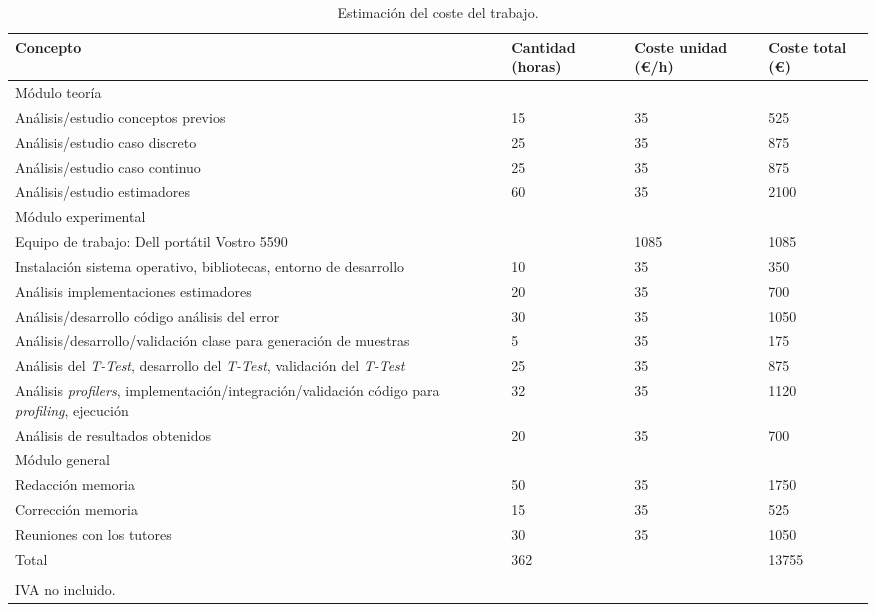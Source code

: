 \documentclass[12pt,a4paper]{report} %
\theoremstyle{definition}
\begin{document}
\begin{table}[hpt]
  
\begin{adjustwidth}{-.4in}{-.4in} 
\centering
\caption{Estimación del coste del trabajo.}
\label{tab:coste}
\begin{tabular}{p{7.3cm}R{2cm}R{2cm}R{2cm}}
  \toprule
Concepto & Cantidad (horas) & Coste unidad (€/h) & Coste total (€)\\
 \midrule
Módulo teoría & & &\\
 \midrule
 Análisis/estudio conceptos previos & 15 & 35 & 525\\[3pt]
 Análisis/estudio caso discreto & 25 & 35 & 875\\[3pt]
 Análisis/estudio caso continuo & 25 & 35 & 875\\[3pt]
 Análisis/estudio estimadores & 60 & 35 & 2100\\[5pt]
 \midrule
 Módulo experimental & & &\\
 \midrule
 Equipo de trabajo: Dell portátil Vostro 5590 & & 1085 & 1085\\[3pt]
 Instalación sistema operativo, bibliotecas, entorno de desarrollo & 10 & 35 & 350\\[3pt]
 Análisis implementaciones estimadores & 20 & 35 & 700\\[3pt]
 Análisis/desarrollo código análisis del error & 30 & 35 & 1050\\[3pt]
 Análisis/desarrollo/validación clase para generación de muestras & 5 & 35 & 175\\[3pt]
 Análisis del \textit{T-Test}, desarrollo del \textit{T-Test}, validación del \textit{T-Test} & 25 & 35 & 875\\[3pt]
 Análisis \textit{profilers}, implementación/integración/validación código para \textit{profiling}, ejecución & 32 & 35 & 1120\\[3pt]
 Análisis de resultados obtenidos & 20 & 35 & 700\\[5pt]
 \midrule
 Módulo general& & &\\
 \midrule
 Redacción memoria & 50 & 35 & 1750\\[3pt]
 Corrección memoria & 15 & 35 & 525\\[3pt]
 Reuniones con los tutores & 30 & 35 & 1050\\[3pt]
 \midrule
 Total & 362 & &13755\\
 \bottomrule\\
 IVA no incluido.&&&\\
\end{tabular}
\end{adjustwidth}
\end{table}

\newpage
\printbibliography
\end{document}

